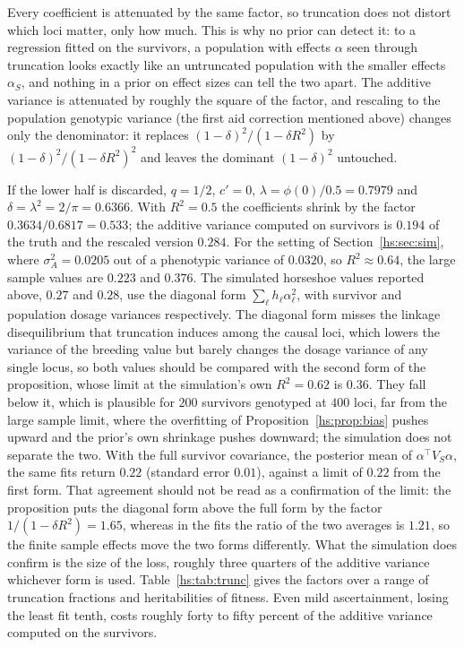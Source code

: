 Every coefficient is attenuated by the same factor, so truncation does not distort which loci matter, only how much. This is why no prior can detect it: to a regression fitted on the survivors, a population with effects $\alpha$ seen through truncation looks exactly like an untruncated population with the smaller effects $\alpha_S$, and nothing in a prior on effect sizes can tell the two apart. The additive variance is attenuated by roughly the square of the factor, and rescaling to the population genotypic variance (the first aid correction mentioned above) changes only the denominator: it replaces $(1-\delta)^2/(1-\delta R^2)$ by $(1-\delta)^2/(1-\delta R^2)^2$ and leaves the dominant $(1-\delta)^2$ untouched.

\begin{example}
\label{hs:ex:trunc}
If the lower half is discarded, $q = 1/2$, $c' = 0$, $\lambda = \phi(0)/0.5 = 0.7979$ and $\delta = \lambda^2 = 2/\pi = 0.6366$. With $R^2 = 0.5$ the coefficients shrink by the factor $0.3634/0.6817 = 0.533$; the additive variance computed on survivors is $0.194$ of the truth and the rescaled version $0.284$. For the setting of Section~\ref{hs:sec:sim}, where $\sigma^2_A = 0.0205$ out of a phenotypic variance of $0.0320$, so $R^2 \approx 0.64$, the large sample values are $0.223$ and $0.376$. The simulated horseshoe values reported above, $0.27$ and $0.28$, use the diagonal form $\sum_\ell h_\ell\alpha_\ell^2$, with survivor and population dosage variances respectively. The diagonal form misses the linkage disequilibrium that truncation induces among the causal loci, which lowers the variance of the breeding value but barely changes the dosage variance of any single locus, so both values should be compared with the second form of the proposition, whose limit at the simulation's own $R^2 = 0.62$ is $0.36$. They fall below it, which is plausible for $200$ survivors genotyped at $400$ loci, far from the large sample limit, where the overfitting of Proposition~\ref{hs:prop:bias} pushes upward and the prior's own shrinkage pushes downward; the simulation does not separate the two. With the full survivor covariance, the posterior mean of $\alpha^\top V_S\alpha$, the same fits return $0.22$ (standard error $0.01$), against a limit of $0.22$ from the first form. That agreement should not be read as a confirmation of the limit: the proposition puts the diagonal form above the full form by the factor $1/(1-\delta R^2) = 1.65$, whereas in the fits the ratio of the two averages is $1.21$, so the finite sample effects move the two forms differently. What the simulation does confirm is the size of the loss, roughly three quarters of the additive variance whichever form is used. Table~\ref{hs:tab:trunc} gives the factors over a range of truncation fractions and heritabilities of fitness. Even mild ascertainment, losing the least fit tenth, costs roughly forty to fifty percent of the additive variance computed on the survivors.


\end{example}
